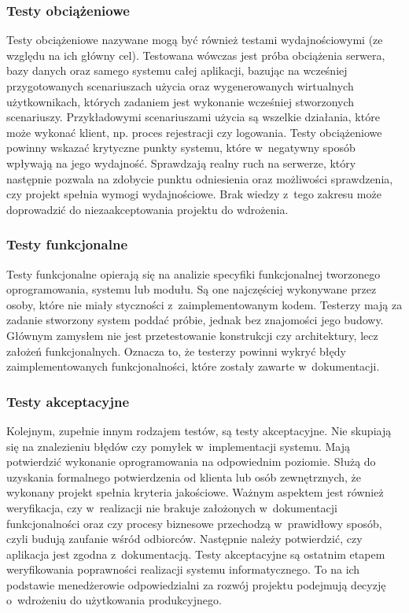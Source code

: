 \documentclass[oneside,polski,logo]{amuthesis}
\begin{document}
\subsubsection {Testy obciążeniowe}
Testy obciążeniowe nazywane mogą być również testami wydajnościowymi (ze względu na ich główny cel). Testowana wówczas jest próba obciążenia serwera, bazy danych oraz samego systemu całej aplikacji, bazując na wcześniej przygotowanych scenariuszach użycia oraz wygenerowanych wirtualnych użytkownikach, których zadaniem jest wykonanie wcześniej stworzonych scenariuszy. Przykładowymi scenariuszami użycia są wszelkie działania, które może wykonać klient, np. proces rejestracji czy logowania. Testy obciążeniowe powinny wskazać krytyczne punkty systemu, które w~negatywny sposób wpływają na jego wydajność. Sprawdzają realny ruch na serwerze, który następnie pozwala na zdobycie punktu odniesienia oraz możliwości sprawdzenia, czy projekt spełnia wymogi wydajnościowe. Brak wiedzy z~tego zakresu może doprowadzić do niezaakceptowania projektu do wdrożenia. \cite{testO}

\subsubsection {Testy funkcjonalne}
Testy funkcjonalne opierają się na analizie specyfiki funkcjonalnej tworzonego oprogramowania, systemu lub modułu. Są one najczęściej wykonywane przez osoby, które nie miały styczności z~zaimplementowanym kodem. Testerzy mają za zadanie stworzony system poddać próbie, jednak bez znajomości jego budowy. Głównym zamysłem nie jest przetestowanie konstrukcji czy architektury, lecz założeń funkcjonalnych. Oznacza to, że testerzy powinni wykryć błędy zaimplementowanych funkcjonalności, które zostały zawarte w~dokumentacji. \cite{testF}

\subsubsection {Testy akceptacyjne}
Kolejnym, zupełnie innym rodzajem testów, są testy akceptacyjne. Nie skupiają się na znalezieniu błędów czy pomyłek w~implementacji systemu. Mają potwierdzić wykonanie oprogramowania na odpowiednim poziomie. Służą do uzyskania formalnego potwierdzenia od klienta lub osób zewnętrznych, że wykonany projekt spełnia kryteria jakościowe. Ważnym aspektem jest również weryfikacja, czy w~realizacji nie brakuje założonych w~dokumentacji funkcjonalności oraz czy procesy biznesowe przechodzą w~prawidłowy sposób, czyli budują zaufanie wśród odbiorców. Następnie należy potwierdzić, czy aplikacja jest zgodna z~dokumentacją. Testy akceptacyjne są ostatnim etapem weryfikowania poprawności realizacji systemu informatycznego. To na ich podstawie menedżerowie odpowiedzialni za rozwój projektu podejmują decyzję o~wdrożeniu do użytkowania produkcyjnego. \cite{testA}
\end{document}
